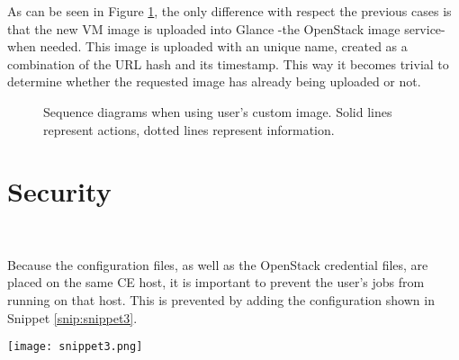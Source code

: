 \documentclass[a4paper]{jpconf}
\begin{document}
As can be seen in Figure \ref{fig:custom}, 
the only difference with respect the previous cases is that the new VM image is uploaded into Glance -the OpenStack image service- when needed.
This image is uploaded with an unique name, 
created as a combination of the URL hash and its timestamp. 
This way it becomes trivial to determine whether the requested image has already being uploaded or not. 

\begin{figure}[h]
    \centering
    \qquad
    \caption{Sequence diagrams when using user's custom image. Solid lines represent actions, dotted lines represent information.}%
    \label{fig:custom}%
\end{figure}


\section{Security}

~

Because the configuration files, as well as the OpenStack credential files, 
are placed on the same CE host, it is important to prevent the user's jobs from running on that host.
This is prevented by adding the configuration shown in Snippet \ref{snip:snippet3}.


\begin{snippet}[h]
    \centering
    \renewcommand\figurename{Snippet}
    \texttt{[image: snippet3.png]}
    \caption{Setup to prevent user's jobs being forked at the HTCondor-CE host.}
    \label{snip:snippet3}
\end{snippet}

\end{document}
